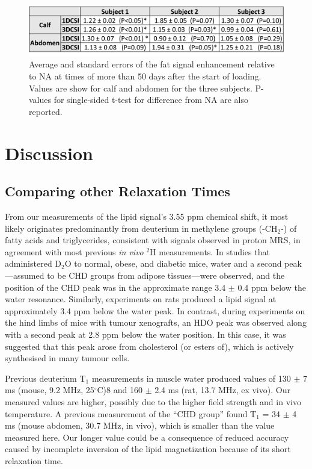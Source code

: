 \documentclass[class=article, crop=false]{standalone}
\begin{document}
\begin{figure}
    \centering
    \includegraphics[width=1\textwidth]{Figures/Lipid/Lipid_Table.png}
    \caption{Average and standard errors of the fat signal enhancement relative to NA at times of more than 50 days after the start of loading. Values are show for calf and abdomen for the three subjects. P-values for single-sided t-test for difference from NA are also reported.}
    \label{fig:Lip:Amp_Table}
\end{figure}

\section{Discussion}

\subsection{Comparing other Relaxation Times}

From our measurements of the lipid signal’s 3.55 ppm chemical shift, it most likely originates predominantly from deuterium in methylene groups (-CH$_2$-) of fatty acids and triglycerides, consistent with signals observed in proton MRS\cite{Ren2008CompositionTesla}, in agreement with most previous \textit{in vivo} $^2$H measurements. In studies that administered D$_2$O to normal, obese, and diabetic mice, water and a second peak—assumed to be CHD groups from adipose tissues—were observed\cite{Brereton1986PreliminarySpectroscopy, Brereton1989TheMice}, and the position of the CHD peak was in the approximate range 3.4 $\pm$ 0.4 ppm below the water resonance. Similarly, experiments on rats produced a lipid signal at approximately 3.4 ppm below the water peak\cite{Kosenkov2018TheMice}. In contrast, during experiments on the hind limbs of mice with tumour xenografts\cite{Assmann2020InCholesterol}, an HDO peak was observed along with a second peak at 2.8 ppm below the water position. In this case, it was suggested\cite{Assmann2020InCholesterol} that this peak arose from cholesterol (or esters of), which is actively synthesised in many tumour cells.

Previous deuterium T$_1$ measurements in muscle water produced values of 130 $\pm$ 7 ms (mouse, 9.2 MHz, 25$^\circ$C)8 and 160 $\pm$ 2.4 ms (rat, 13.7 MHz, ex vivo)\cite{Block1987COMMUNICATIONSTissues}. Our measured values are higher, possibly due to the higher field strength and in vivo temperature. A previous measurement of the “CHD group” found T$_1$ = 34 $\pm$ 4 ms (mouse abdomen, 30.7 MHz, in vivo)\cite{Brereton1986PreliminarySpectroscopy}, which is smaller than the value measured here. Our longer value could be a consequence of reduced accuracy caused by incomplete inversion of the lipid magnetization because of its short relaxation time\cite{Pfaff2017PredictingPulses}.
\end{document}
